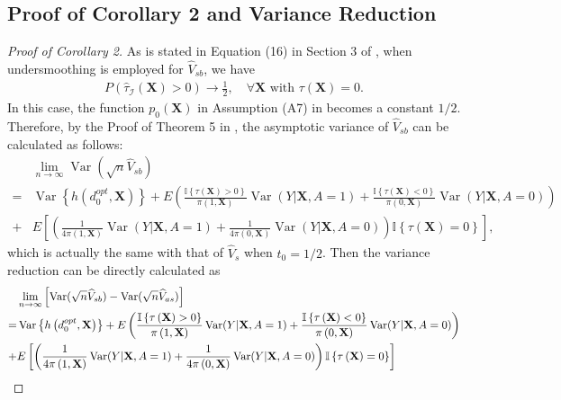 \documentclass[11pt]{article}
\theoremstyle{referenceplain}
\theoremstyle{referencedefinition}
\theoremstyle{referenceremark}
\begin{document}
\subsection{Proof of Corollary 2 and Variance Reduction}
\begin{proof}[Proof of Corollary 2]
As is stated in Equation (16) in Section 3 of \citet{shi2020breaking}, when undersmoothing is employed for $\widehat{V}_{sb}$, we have 
\begin{align*}
    P\left(\widehat{\tau}_{\mathcal{I}}(\mathbf{X})>0\right) \rightarrow \frac{1}{2}, \quad \forall \mathbf{X}\text { with } \tau(\mathbf{X})=0.
\end{align*}
In this case, the function $p_0(\mathbf{X})$ in Assumption (A7) in \citet{shi2020breaking} becomes a constant $1/2$. Therefore, by the Proof of Theorem 5 in \citet{shi2020breaking}, the asymptotic variance of $\widehat{V}_{sb}$ can be calculated as follows: 
\begin{align*}
    &\lim_{n\to\infty}\operatorname{Var}(\sqrt{n}\widehat{V}_{sb})\\
    =&\operatorname{Var}\left\{h\left(d_0^{o p t}, \mathbf{X}\right)\right\} + E\left(\frac{\mathbb{I}\left\{\tau\left(\mathbf{X}\right)>0\right\}}{\pi\left(1, \mathbf{X}\right)}\operatorname{Var}(Y|\mathbf{X},A=1)+\frac{\mathbb{I}\left\{\tau\left(\mathbf{X}\right)<0\right\}}{\pi\left(0, \mathbf{X}\right)}\operatorname{Var}(Y|\mathbf{X},A=0)\right)\\
    +& E\left[\left(\frac{1}{4 \pi\left(1, \mathbf{X}\right)}\operatorname{Var}(Y|\mathbf{X},A=1)+\frac{1}{4\pi\left(0, \mathbf{X}\right)}\operatorname{Var}(Y|\mathbf{X},A=0)\right) \mathbb{I}\left\{\tau\left(\mathbf{X}\right)=0\right\}\right],
\end{align*}
which is actually the same with that of $\widehat{V}_{s}$ when $t_0=1/2$. Then the variance reduction can be directly calculated as
\begin{align*}
   &\lim_{n\to\infty}\left[ \operatorname{Var}(\sqrt{n}\widehat{V}_{sb}) - \operatorname{Var}(\sqrt{n}\widehat{V}_{as})\right]\notag\\
    =&\operatorname{Var}\left\{h\left(d_0^{o p t}, \mathbf{X}\right)\right\} + E\left(\frac{\mathbb{I}\left\{\tau\left(\mathbf{X}\right)>0\right\}}{\pi\left(1, \mathbf{X}\right)}\operatorname{Var}(Y|\mathbf{X},A=1)+\frac{\mathbb{I}\left\{\tau\left(\mathbf{X}\right)<0\right\}}{\pi\left(0, \mathbf{X}\right)}\operatorname{Var}(Y|\mathbf{X},A=0)\right)\\
    +& E\left[\left(\frac{1}{4 \pi\left(1, \mathbf{X}\right)}\operatorname{Var}(Y|\mathbf{X},A=1)+\frac{1}{4\pi\left(0, \mathbf{X}\right)}\operatorname{Var}(Y|\mathbf{X},A=0)\right) \mathbb{I}\left\{\tau\left(\mathbf{X}\right)=0\right\}\right]\\

\end{align*}
\end{proof}
\end{document}
